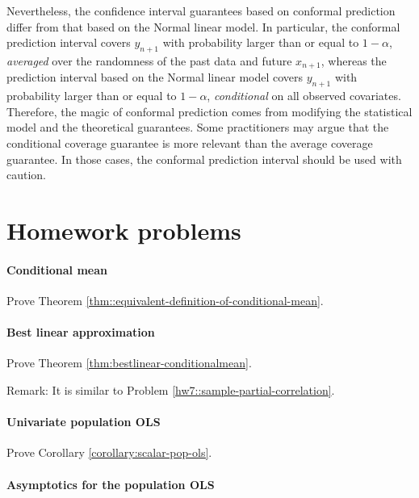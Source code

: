 Nevertheless, the confidence interval guarantees based on conformal prediction differ from that based on the Normal linear model. In particular, the conformal prediction interval covers $y_{n+1}$ with probability larger than or equal to $1-\alpha$, {\it averaged} over the randomness of the past data and future $x_{n+1}$, whereas the prediction interval based on the Normal linear model covers $y_{n+1}$ with probability larger than or equal to $1-\alpha$, {\it conditional} on all observed covariates. 
Therefore, the magic of conformal prediction comes from modifying the statistical model and the theoretical guarantees. 
Some practitioners may argue that the conditional coverage guarantee is more relevant than the average coverage guarantee. In those cases, the conformal prediction interval should be used with caution. 



\section{Homework problems}

\paragraph{Conditional mean}\label{hw11::population-mean}

Prove Theorem \ref{thm::equivalent-definition-of-conditional-mean}. 

\paragraph{Best linear approximation}\label{hw11::condition-mean-app}

Prove Theorem \ref{thm:bestlinear-conditionalmean}.

Remark: It is similar to Problem \ref{hw7::sample-partial-correlation}.

\paragraph{Univariate population OLS}\label{hw11::univariate-ols}

Prove Corollary \ref{corollary:scalar-pop-ols}.

\paragraph{Asymptotics for the population OLS}\label{hw11::population-ols-asymptotics}

